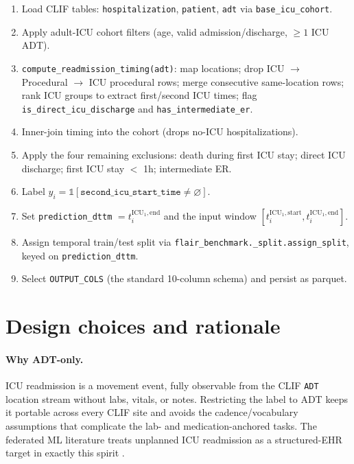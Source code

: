 \documentclass[11pt]{article}
\newcommand{\ticustart}{t^{\text{ICU}_1,\text{start}}}
\newcommand{\ticuend}{t^{\text{ICU}_1,\text{end}}}
\begin{document}
\begin{enumerate}[leftmargin=2em]
  \item Load CLIF tables: \texttt{hospitalization}, \texttt{patient},
        \texttt{adt} via \texttt{base\_icu\_cohort}.
  \item Apply adult-ICU cohort filters (age, valid admission/discharge,
        $\geq 1$ ICU ADT).
  \item \texttt{compute\_readmission\_timing(adt)}: map locations; drop
        ICU $\to$ Procedural $\to$ ICU procedural rows; merge consecutive
        same-location rows; rank ICU groups to extract first/second ICU
        times; flag \texttt{is\_direct\_icu\_discharge} and
        \texttt{has\_intermediate\_er}.
  \item Inner-join timing into the cohort (drops no-ICU hospitalizations).
  \item Apply the four remaining exclusions: death during first ICU stay;
        direct ICU discharge; first ICU stay $<$ 1h; intermediate ER.
  \item Label $y_i = \mathbb{1}[\texttt{second\_icu\_start\_time} \neq
        \varnothing]$.
  \item Set \texttt{prediction\_dttm} $= \ticuend_i$ and the input window
        $[\ticustart_i, \ticuend_i]$.
  \item Assign temporal train/test split via
        \texttt{flair\_benchmark.\_split.assign\_split}, keyed on
        \texttt{prediction\_dttm}.
  \item Select \texttt{OUTPUT\_COLS} (the standard 10-column schema) and
        persist as parquet.
\end{enumerate}

\section{Design choices and rationale}
\label{sec:rationale}

\paragraph{Why ADT-only.}
ICU readmission is a movement event, fully observable from the CLIF
\texttt{ADT} location stream without labs, vitals, or notes. Restricting
the label to ADT keeps it portable across every CLIF site and avoids the
cadence/vocabulary assumptions that complicate the lab- and
medication-anchored tasks. The federated ML literature treats unplanned
ICU readmission as a structured-EHR target in exactly this spirit
\citep{rojas2018readmission}.
\end{document}
